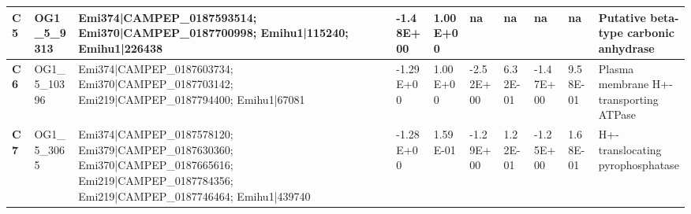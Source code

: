 \begin{landscape}
\begin{center}
\begin{footnotesize}
\begin{longtable}{|p{0.5cm}|p{1.5cm}|p{4cm}|l|l|l|l|l|l|l|}
\textbf{C5}  & OG1\_5\_9313  & Emi374|CAMPEP\_0187593514; Emi370|CAMPEP\_0187700998; Emihu1|115240; Emihu1|226438                                                                                                                                                                                                                                                                                                                                                                                                                                                                                                                                                       & -1.48E+00 & 1.00E+00 & na        & na       & na        & na       & Putative beta-type carbonic anhydrase                                        \\ \hline
\textbf{C6}  & OG1\_5\_10396 & Emi374|CAMPEP\_0187603734; Emi370|CAMPEP\_0187703142; Emi219|CAMPEP\_0187794400; Emihu1|67081                                                                                                                                                                                                                                                                                                                                                                                                                                                                                                                                            & -1.29E+00 & 1.00E+00 & -2.52E+00 & 6.32E-01 & -1.47E+00 & 9.58E-01 & Plasma membrane H+-transporting ATPase                                       \\ \hline
\textbf{C7}  & OG1\_5\_3065  & Emi374|CAMPEP\_0187578120; Emi379|CAMPEP\_0187630360; Emi370|CAMPEP\_0187665616; Emi219|CAMPEP\_0187784356; Emi219|CAMPEP\_0187746464; Emihu1|439740                                                                                                                                                                                                                                                                                                                                                                                                                                                                                     & -1.28E+00 & 1.59E-01 & -1.29E+00 & 1.22E-01 & -1.25E+00 & 1.68E-01 & H+-translocating pyrophosphatase                                             \\ \hline

\end{longtable}
\end{footnotesize}
\end{center}
\end{landscape}
